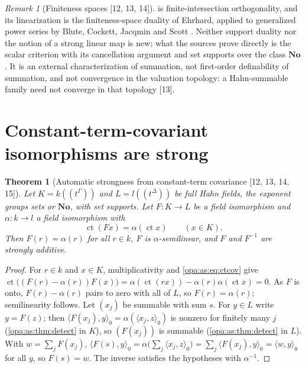 \documentclass[11pt,oneside]{article}
\numberwithin{equation}{section}
\newtheorem{theorem}{Theorem}[section]
\theoremstyle{definition}
\theoremstyle{remark}
\newtheorem{remark}[remark]{Remark}
\newcommand{\No}{\mathbf{No}}
\newcommand{\ct}{\operatorname{ct}}
\newcommand{\Hahn}[2]{#1((t^{#2}))}
\newcommand{\src}[1]{\textup{\textsf{\small[#1]}}}
\newcommand{\pairing}[2]{\langle #1,#2\rangle_0}
\begin{document}
\begin{remark}[Finiteness spaces \src{12, 13, 14}]\label{opa:as:rem:finiteness}
 is finite-intersection orthogonality, and its linearization
is the finiteness-space duality of Ehrhard, applied to generalized power series by Blute,
Cockett, Jacqmin and Scott \cite{BCJS}. Neither support duality nor the notion of a strong
linear map is new; what the sources prove directly is the scalar criterion with its
cancellation argument and set supports over the class $\No$. It is an external
characterization of summation, not first-order definability of summation, and not
convergence in the valuation topology: a Hahn-summable family need not converge in that
topology \src{13}.
\end{remark}

\section{Constant-term-covariant isomorphisms are strong}\label{opa:as:sec:ctiso}

\begin{theorem}[Automatic strongness from constant-term covariance \src{12, 13, 14, 15}]\label{opa:as:thm:ctiso}
Let $K=\Hahn k\Gamma$ and $L=\Hahn l\Delta$ be full Hahn fields, the exponent groups sets or
$\No$, with set supports. Let $F:K\to L$ be a field isomorphism and $\alpha:k\to l$ a field
isomorphism with
\begin{equation}\label{opa:as:eq:ctcov}
 \ct(F x)=\alpha(\ct x)\qquad(x\in K).
\end{equation}
Then $F(r)=\alpha(r)$ for all $r\in k$, $F$ is $\alpha$-semilinear, and $F$ and $F^{-1}$ are
strongly additive.
\end{theorem}
\begin{proof}
For $r\in k$ and $x\in K$, multiplicativity and \eqref{opa:as:eq:ctcov} give
$\ct\bigl((F(r)-\alpha(r))F(x)\bigr)=\alpha(\ct(rx))-\alpha(r)\alpha(\ct x)=0$. As $F$ is
onto, $F(r)-\alpha(r)$ pairs to zero with all of $L$, so $F(r)=\alpha(r)$; semilinearity
follows. Let $(x_j)$ be summable with sum $s$. For $y\in L$ write $y=F(z)$; then
$\pairing{F(x_j)}y=\alpha(\pairing{x_j}z)$ is nonzero for finitely many $j$
(\cref{opa:as:thm:detect} in $K$), so $(F(x_j))$ is summable
(\cref{opa:as:thm:detect} in $L$). With $w=\sum_jF(x_j)$,
$\pairing{F(s)}y=\alpha\bigl(\sum_j\pairing{x_j}z\bigr)=\sum_j\pairing{F(x_j)}y=\pairing wy$
for all $y$, so $F(s)=w$. The inverse satisfies the hypotheses with $\alpha^{-1}$.
\end{proof}
\end{document}
